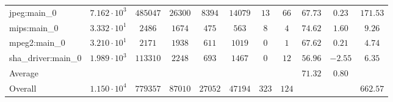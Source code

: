 \begin{tabular}{|l|c|c|c|c|c|c|c|c|c|c|}
jpeg:main\_0            & $ 7.162 \cdot 10^{3} $ & $ 485047 $ & $ 26300 $ & $ 8394  $ & $ 14079 $ & $ 13  $ & $ 66  $ & $ 67.73       $ & $ 0.23    $ & $ 171.53  $ \\
mips:main\_0            & $ 3.332 \cdot 10^{1} $ & $ 2486   $ & $ 1674  $ & $ 475   $ & $ 563   $ & $ 8   $ & $ 4   $ & $ 74.62       $ & $ 1.60    $ & $ 9.26    $ \\
mpeg2:main\_0           & $ 3.210 \cdot 10^{1} $ & $ 2171   $ & $ 1938  $ & $ 611   $ & $ 1019  $ & $ 0   $ & $ 1   $ & $ 67.62       $ & $ 0.21    $ & $ 4.74    $ \\
sha\_driver:main\_0     & $ 1.989 \cdot 10^{3} $ & $ 113310 $ & $ 2248  $ & $ 693   $ & $ 1467  $ & $ 0   $ & $ 12  $ & $ 56.96       $ & $ -2.55   $ & $ 6.35    $ \\
\hline
Average                 & $                    $ & $        $ & $       $ & $       $ & $       $ & $     $ & $     $ & $ 71.32       $ & $ 0.80    $ & $         $ \\
\hline
Overall                 & $ 1.150 \cdot 10^{4} $ & $ 779357 $ & $ 87010 $ & $ 27052 $ & $ 47194 $ & $ 323 $ & $ 124 $ & $             $ & $         $ & $ 662.57  $ \\
\hline
\end{tabular}
